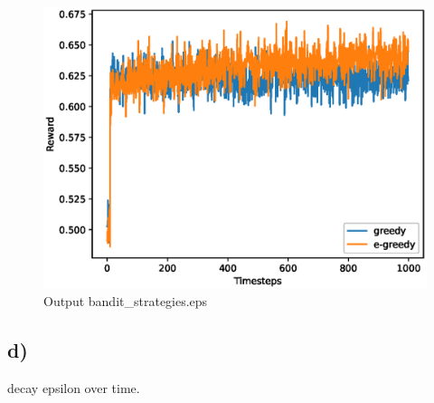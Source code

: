 \documentclass[a4paper]{article}
\begin{document}
\begin{figure}[!ht]
	\centering
	\includegraphics[width=0.7\linewidth]{bandit_strategies}
	\caption{Output bandit\_strategies.eps}
	\label{fig:banditstrategies}
\end{figure}


\subsection*{d)} 
decay epsilon over time.
\end{document}
